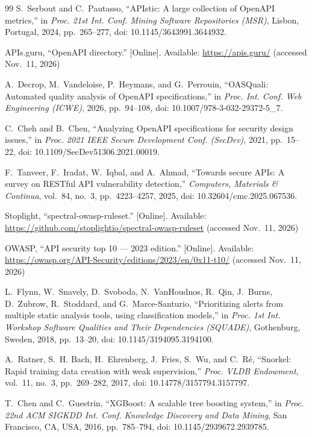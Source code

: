 \documentclass[conference]{IEEEtran}
\begin{document}
\begin{thebibliography}{99}
S.~Serbout and C.~Pautasso, ``APIstic: A large collection of OpenAPI metrics,'' in
\emph{Proc. 21st Int. Conf. Mining Software Repositories (MSR)}, Lisbon, Portugal, 2024,
pp.~265--277, doi: 10.1145/3643991.3644932.

APIs.guru, ``OpenAPI directory.'' [Online]. Available: \url{https://apis.guru/} (accessed Nov.~11, 2026)

A.~Decrop, M.~Vandeloise, P.~Heymans, and G.~Perrouin, ``OASQuali: Automated quality analysis
of OpenAPI specifications,'' in \emph{Proc. Int. Conf. Web Engineering (ICWE)}, 2026,
pp.~94--108, doi: 10.1007/978-3-032-29372-5\_7.

C.~Cheh and B.~Chen, ``Analyzing OpenAPI specifications for security design issues,'' in
\emph{Proc. 2021 IEEE Secure Development Conf. (SecDev)}, 2021, pp.~15--22, doi:
10.1109/SecDev51306.2021.00019.

F.~Tanveer, F.~Iradat, W.~Iqbal, and A.~Ahmad, ``Towards secure APIs: A survey on RESTful API
vulnerability detection,'' \emph{Computers, Materials \& Continua}, vol.~84, no.~3,
pp.~4223--4257, 2025, doi: 10.32604/cmc.2025.067536.

Stoplight, ``spectral-owasp-ruleset.'' [Online]. Available:
\url{https://github.com/stoplightio/spectral-owasp-ruleset} (accessed Nov.~11, 2026)

OWASP, ``API security top 10 --- 2023 edition.'' [Online]. Available:
\url{https://owasp.org/API-Security/editions/2023/en/0x11-t10/} (accessed Nov.~11, 2026)

L.~Flynn, W.~Snavely, D.~Svoboda, N.~VanHoudnos, R.~Qin, J.~Burns, D.~Zubrow, R.~Stoddard,
and G.~Marce-Santurio, ``Prioritizing alerts from multiple static analysis tools, using
classification models,'' in \emph{Proc. 1st Int. Workshop Software Qualities and Their
Dependencies (SQUADE)}, Gothenburg, Sweden, 2018, pp.~13--20, doi: 10.1145/3194095.3194100.

A.~Ratner, S.~H. Bach, H.~Ehrenberg, J.~Fries, S.~Wu, and C.~R\'e, ``Snorkel: Rapid training data
creation with weak supervision,'' \emph{Proc. VLDB Endowment}, vol.~11, no.~3, pp.~269--282, 2017,
doi: 10.14778/3157794.3157797.

T.~Chen and C.~Guestrin, ``XGBoost: A scalable tree boosting system,'' in \emph{Proc. 22nd ACM
SIGKDD Int. Conf. Knowledge Discovery and Data Mining}, San Francisco, CA, USA, 2016,
pp.~785--794, doi: 10.1145/2939672.2939785.


\end{thebibliography}
\end{document}
